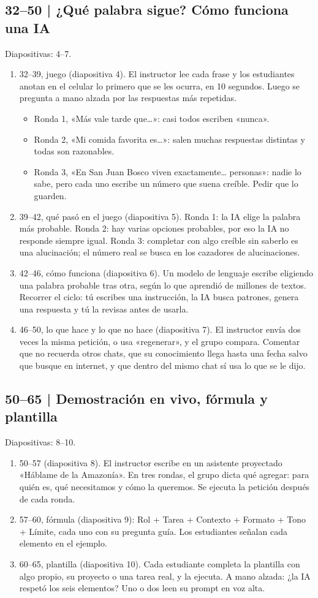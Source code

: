 \documentclass[11pt,a4paper]{article}
\newcommand{\diapos}[1]{\textcolor{gris}{\small\textsf{Diapositivas: #1}}\par}
\begin{document}
\subsection{32--50 | ¿Qué palabra sigue? Cómo funciona una IA}
\diapos{4--7.}
\begin{enumerate}
\item 32--39, juego (diapositiva 4). El instructor lee cada frase y los estudiantes anotan en el celular lo primero que se les ocurra, en 10 segundos. Luego se pregunta a mano alzada por las respuestas más repetidas.
  \begin{itemize}
  \item Ronda 1, «Más vale tarde que…»: casi todos escriben «nunca».
  \item Ronda 2, «Mi comida favorita es…»: salen muchas respuestas distintas y todas son razonables.
  \item Ronda 3, «En San Juan Bosco viven exactamente… personas»: nadie lo sabe, pero cada uno escribe un número que suena creíble. Pedir que lo guarden.
  \end{itemize}
\item 39--42, qué pasó en el juego (diapositiva 5). Ronda 1: la IA elige la palabra más probable. Ronda 2: hay varias opciones probables, por eso la IA no responde siempre igual. Ronda 3: completar con algo creíble sin saberlo es una alucinación; el número real se busca en los cazadores de alucinaciones.
\item 42--46, cómo funciona (diapositiva 6). Un modelo de lenguaje escribe eligiendo una palabra probable tras otra, según lo que aprendió de millones de textos. Recorrer el ciclo: tú escribes una instrucción, la IA busca patrones, genera una respuesta y tú la revisas antes de usarla.
\item 46--50, lo que hace y lo que no hace (diapositiva 7). El instructor envía dos veces la misma petición, o usa «regenerar», y el grupo compara. Comentar que no recuerda otros chats, que su conocimiento llega hasta una fecha salvo que busque en internet, y que dentro del mismo chat sí usa lo que se le dijo.
\end{enumerate}

\subsection{50--65 | Demostración en vivo, fórmula y plantilla}
\diapos{8--10.}
\begin{enumerate}
\item 50--57 (diapositiva 8). El instructor escribe en un asistente proyectado «Háblame de la Amazonía». En tres rondas, el grupo dicta qué agregar: para quién es, qué necesitamos y cómo la queremos. Se ejecuta la petición después de cada ronda.
\item 57--60, fórmula (diapositiva 9): Rol + Tarea + Contexto + Formato + Tono + Límite, cada uno con su pregunta guía. Los estudiantes señalan cada elemento en el ejemplo.
\item 60--65, plantilla (diapositiva 10). Cada estudiante completa la plantilla con algo propio, su proyecto o una tarea real, y la ejecuta. A mano alzada: ¿la IA respetó los seis elementos? Uno o dos leen su prompt en voz alta.
\end{enumerate}
\end{document}
